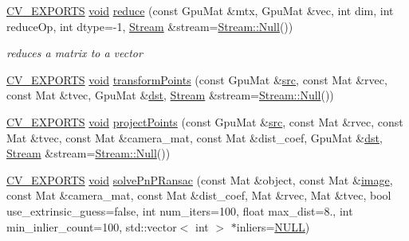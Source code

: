 \begin{DoxyCompactItemize}
\item 
\hyperlink{core_2types__c_8h_a1bf9f0e121b54272da02379cfccd0a2b}{C\-V\-\_\-\-E\-X\-P\-O\-R\-T\-S} \hyperlink{legacy_8hpp_a8bb47f092d473522721002c86c13b94e}{void} \hyperlink{namespacecv_1_1gpu_a674736a7da871eaa103883407c4d839b}{reduce} (const Gpu\-Mat \&mtx, Gpu\-Mat \&vec, int dim, int reduce\-Op, int dtype=-\/1, \hyperlink{classcv_1_1gpu_1_1Stream}{Stream} \&stream=\hyperlink{classcv_1_1gpu_1_1Stream_af96c23564834f88333dcb8997df553f1}{Stream\-::\-Null}())
\begin{DoxyCompactList}\small\item\em reduces a matrix to a vector \end{DoxyCompactList}\item 
\hyperlink{core_2types__c_8h_a1bf9f0e121b54272da02379cfccd0a2b}{C\-V\-\_\-\-E\-X\-P\-O\-R\-T\-S} \hyperlink{legacy_8hpp_a8bb47f092d473522721002c86c13b94e}{void} \hyperlink{namespacecv_1_1gpu_a63a5cdc3242498687841990ffdaa303c}{transform\-Points} (const Gpu\-Mat \&\hyperlink{legacy_8hpp_a371cd109b74033bc4366f584edd3dacc}{src}, const Mat \&rvec, const Mat \&tvec, Gpu\-Mat \&\hyperlink{photo__c_8h_aed13e2a25279b24dc954073233fef7a5}{dst}, \hyperlink{classcv_1_1gpu_1_1Stream}{Stream} \&stream=\hyperlink{classcv_1_1gpu_1_1Stream_af96c23564834f88333dcb8997df553f1}{Stream\-::\-Null}())
\item 
\hyperlink{core_2types__c_8h_a1bf9f0e121b54272da02379cfccd0a2b}{C\-V\-\_\-\-E\-X\-P\-O\-R\-T\-S} \hyperlink{legacy_8hpp_a8bb47f092d473522721002c86c13b94e}{void} \hyperlink{namespacecv_1_1gpu_a6144a51e8d6a8ec48a94b9053d69fb6e}{project\-Points} (const Gpu\-Mat \&\hyperlink{legacy_8hpp_a371cd109b74033bc4366f584edd3dacc}{src}, const Mat \&rvec, const Mat \&tvec, const Mat \&camera\-\_\-mat, const Mat \&dist\-\_\-coef, Gpu\-Mat \&\hyperlink{photo__c_8h_aed13e2a25279b24dc954073233fef7a5}{dst}, \hyperlink{classcv_1_1gpu_1_1Stream}{Stream} \&stream=\hyperlink{classcv_1_1gpu_1_1Stream_af96c23564834f88333dcb8997df553f1}{Stream\-::\-Null}())
\item 
\hyperlink{core_2types__c_8h_a1bf9f0e121b54272da02379cfccd0a2b}{C\-V\-\_\-\-E\-X\-P\-O\-R\-T\-S} \hyperlink{legacy_8hpp_a8bb47f092d473522721002c86c13b94e}{void} \hyperlink{namespacecv_1_1gpu_a05d4663999c9d548c97f8d6d55401b6e}{solve\-Pn\-P\-Ransac} (const Mat \&object, const Mat \&\hyperlink{legacy_8hpp_ad62b16ab219ae2483e8a3d921c44cc97}{image}, const Mat \&camera\-\_\-mat, const Mat \&dist\-\_\-coef, Mat \&rvec, Mat \&tvec, bool use\-\_\-extrinsic\-\_\-guess=false, int num\-\_\-iters=100, float max\-\_\-dist=8., int min\-\_\-inlier\-\_\-count=100, std\-::vector$<$ int $>$ $\ast$inliers=\hyperlink{Config_8cpp_a070d2ce7b6bb7e5c05602aa8c308d0c4}{N\-U\-L\-L})

\end{DoxyCompactItemize}
